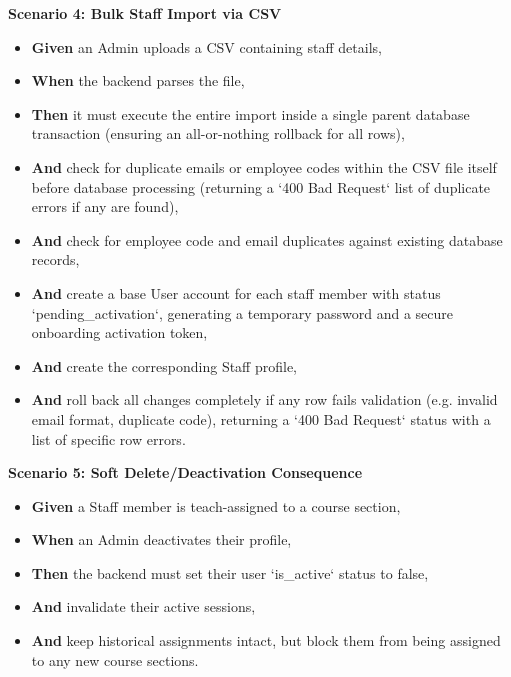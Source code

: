 \noindent\textbf{Scenario 4: Bulk Staff Import via CSV}\\
\begin{itemize}
  \item \textbf{Given} an Admin uploads a CSV containing staff details,
  \item \textbf{When} the backend parses the file,
  \item \textbf{Then} it must execute the entire import inside a single parent database transaction (ensuring an all-or-nothing rollback for all rows),
  \item \textbf{And} check for duplicate emails or employee codes within the CSV file itself before database processing (returning a `400 Bad Request` list of duplicate errors if any are found),
  \item \textbf{And} check for employee code and email duplicates against existing database records,
  \item \textbf{And} create a base User account for each staff member with status `pending\_activation`, generating a temporary password and a secure onboarding activation token,
  \item \textbf{And} create the corresponding Staff profile,
  \item \textbf{And} roll back all changes completely if any row fails validation (e.g. invalid email format, duplicate code), returning a `400 Bad Request` status with a list of specific row errors.
\end{itemize}


\noindent\textbf{Scenario 5: Soft Delete/Deactivation Consequence}\\
\begin{itemize}
  \item \textbf{Given} a Staff member is teach-assigned to a course section,
  \item \textbf{When} an Admin deactivates their profile,
  \item \textbf{Then} the backend must set their user `is\_active` status to false,
  \item \textbf{And} invalidate their active sessions,
  \item \textbf{And} keep historical assignments intact, but block them from being assigned to any new course sections.
\end{itemize}


